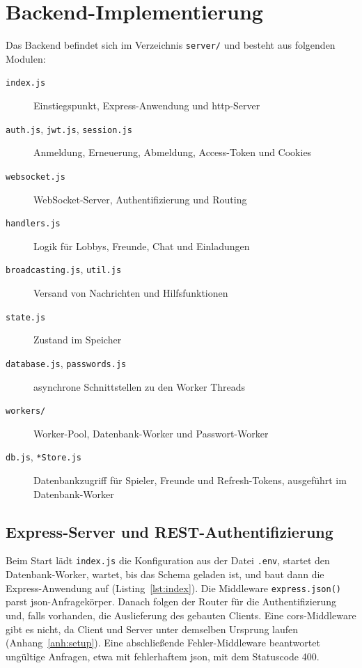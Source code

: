 \chapter{Backend-Implementierung}
\label{kap:backend}
\verfasser{\autorSE}

Das Backend befindet sich im Verzeichnis \texttt{server/} und besteht aus folgenden Modulen:

\begin{description}
  \item[\texttt{index.js}] Einstiegspunkt, Express-Anwendung und \gls{http}-Server
  \item[\texttt{auth.js}, \texttt{jwt.js}, \texttt{session.js}] Anmeldung, Erneuerung, Abmeldung, Access-Token und Cookies
  \item[\texttt{websocket.js}] WebSocket-Server, Authentifizierung und Routing
  \item[\texttt{handlers.js}] Logik für Lobbys, Freunde, Chat und Einladungen
  \item[\texttt{broadcasting.js}, \texttt{util.js}] Versand von Nachrichten und Hilfsfunktionen
  \item[\texttt{state.js}] Zustand im Speicher
  \item[\texttt{database.js}, \texttt{passwords.js}] asynchrone Schnittstellen zu den Worker Threads
  \item[\texttt{workers/}] Worker-Pool, Datenbank-Worker und Passwort-Worker
  \item[\texttt{db.js}, \texttt{*Store.js}] Datenbankzugriff für Spieler, Freunde und Refresh-Tokens, ausgeführt im Datenbank-Worker
\end{description}

\section{Express-Server und REST-Authentifizierung}

Beim Start lädt \texttt{index.js} die Konfiguration aus der Datei \texttt{.env}, startet den Datenbank-Worker, wartet, bis das Schema geladen ist, und baut dann die Express-Anwendung auf (Listing~\ref{lst:index}). Die Middleware \texttt{express.json()} parst \gls{json}-Anfragekörper. Danach folgen der Router für die Authentifizierung und, falls vorhanden, die Auslieferung des gebauten Clients. Eine \gls{cors}-Middleware gibt es nicht, da Client und Server unter demselben Ursprung laufen (Anhang~\ref{anh:setup}). Eine abschließende Fehler-Middleware beantwortet ungültige Anfragen, etwa mit fehlerhaftem \gls{json}, mit dem Statuscode 400.

